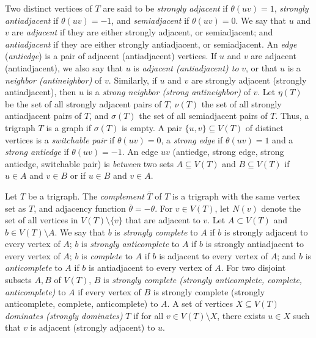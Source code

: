 \documentclass[11 pt] {article}
\begin{document}
Two distinct vertices of $T$ are said to be {\em strongly adjacent} if
$\theta(uv)=1$, {\em strongly antiadjacent} if $\theta(uv)=-1$, and
{\em semiadjacent} if $\theta(uv)=0$. We say that $u$ and $v$ are
{\em adjacent} if they are either strongly adjacent, or semiadjacent;
and {\em antiadjacent} if they are either strongly antiadjacent, or
semiadjacent. An \emph{edge} (\emph{antiedge}) is a pair of adjacent
(antiadjacent) vertices. If $u$ and $v$ are adjacent (antiadjacent),
we also say that $u$ is {\em adjacent (antiadjacent) to} $v$, or that
$u$ is a {\em neighbor (antineighbor)} of $v$. Similarly, if $u$ and
$v$ are strongly adjacent (strongly antiadjacent), then $u$ is a {\em
  strong neighbor (strong antineighbor)} of $v$. Let $\eta(T)$ be the
set of all strongly adjacent pairs of $T$, $\nu(T)$ the set of all
strongly antiadjacent pairs of $T$, and $\sigma(T)$ the set of all
semiadjacent pairs of $T$. Thus, a trigraph $T$ is a graph if
$\sigma(T)$ is empty. A pair $\{u, v\} \subseteq V(T)$ of distinct
vertices is a \emph{switchable pair} if $\theta(uv) = 0$, a
\emph{strong edge} if $\theta(uv) = 1$ and a \emph{strong antiedge} if
$\theta(uv) = -1$.  An edge $uv$ (antiedge, strong edge, strong
antiedge, switchable pair) is \emph{between} two sets $A \subseteq
V(T)$ and $B \subseteq V(T)$ if $u\in A$ and $v \in B$ or if $u \in B$
and $v \in A$.


Let $T$ be a trigraph. The \emph{complement} $\overline{T}$ of $T$ is a
trigraph with the same vertex set as $T$, and adjacency function
$\overline{\theta}=-\theta$. For $v \in V(T)$, let $N(v)$ denote the
set of all vertices in $V(T) \setminus \{v\}$ that are adjacent to
$v$. Let $A \subset V(T)$ and $b
\in V(T) \setminus A$. We say that $b$ is {\em strongly complete} to
$A$ if $b$ is strongly adjacent to every vertex of $A$; $b$ is {\em
 strongly anticomplete} to $A$ if $b$ is strongly antiadjacent to
every vertex of $A$; $b$ is {\em complete} to $A$ if $b$ is adjacent
to every vertex of $A$; and $b$ is {\em anticomplete} to $A$ if $b$ is
antiadjacent to every vertex of $A$. For two disjoint subsets $A,B$
of $V(T)$, $B$ is {\em strongly complete (strongly anticomplete,
 complete, anticomplete)} to $A$ if every vertex of $B$ is strongly
complete (strongly anticomplete, complete, anticomplete) to $A$. A
set of vertices $X\subseteq V(T)$ \emph{dominates (strongly
 dominates)} $T$ if for all $v\in V(T)\setminus X$, there exists
$u\in X$ such that $v$ is adjacent (strongly adjacent) to $u$.
\end{document}

